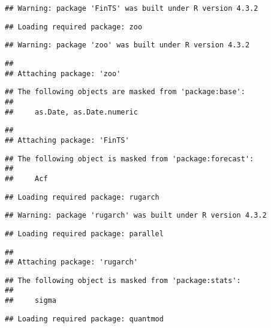 \documentclass[
]{article}
\begin{document}
\begin{verbatim}
## Warning: package 'FinTS' was built under R version 4.3.2
\end{verbatim}

\begin{verbatim}
## Loading required package: zoo
\end{verbatim}

\begin{verbatim}
## Warning: package 'zoo' was built under R version 4.3.2
\end{verbatim}

\begin{verbatim}
## 
## Attaching package: 'zoo'
\end{verbatim}

\begin{verbatim}
## The following objects are masked from 'package:base':
## 
##     as.Date, as.Date.numeric
\end{verbatim}

\begin{verbatim}
## 
## Attaching package: 'FinTS'
\end{verbatim}

\begin{verbatim}
## The following object is masked from 'package:forecast':
## 
##     Acf
\end{verbatim}

\begin{verbatim}
## Loading required package: rugarch
\end{verbatim}

\begin{verbatim}
## Warning: package 'rugarch' was built under R version 4.3.2
\end{verbatim}

\begin{verbatim}
## Loading required package: parallel
\end{verbatim}

\begin{verbatim}
## 
## Attaching package: 'rugarch'
\end{verbatim}

\begin{verbatim}
## The following object is masked from 'package:stats':
## 
##     sigma
\end{verbatim}

\begin{verbatim}
## Loading required package: quantmod
\end{verbatim}
\end{document}

